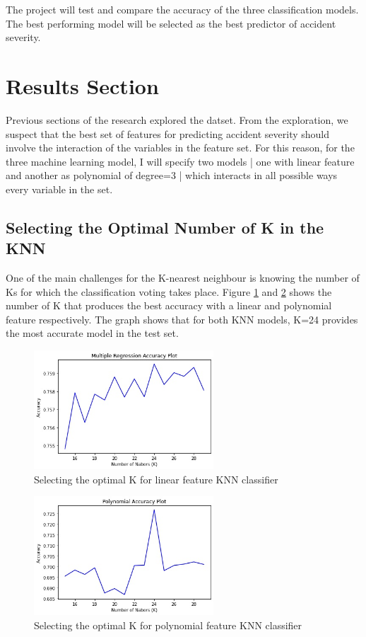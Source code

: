 \documentclass[a4paper,12pt]{article}
\begin{document}
The project will test and compare the accuracy of the three classification models. The best performing model will be selected as the best predictor of accident severity.

\section{Results Section}
Previous sections of the research explored the datset. From the exploration, we suspect that the best set of features for predicting accident severity should involve the interaction of the variables in the feature set. For this reason, for the three machine learning model, I will specify two models | one with linear feature and another as polynomial of degree=3 | which interacts in all possible ways every variable in the set.

\subsection{Selecting the Optimal Number of K in the KNN}
One of the main challenges for the K-nearest neighbour is knowing the number of Ks for which the classification voting takes place. Figure \ref{fig8} and \ref{fig9} shows the number of K that produces the best accuracy with a linear and polynomial feature respectively. The graph shows that for both KNN models, K=24 provides the most accurate model in the test set.

\begin{figure}[H]
	\centering
	\includegraphics[width=0.6\textwidth]{KNN.jpg}
	\caption{Selecting the optimal K for linear feature KNN classifier}
	\label{fig8}
\end{figure}

\begin{figure}[H]
	\centering
	\includegraphics[width=0.6\textwidth]{KNN_poly.jpg}
	\caption{Selecting the optimal K for polynomial feature KNN classifier}
	\label{fig9}
\end{figure}
\end{document}
